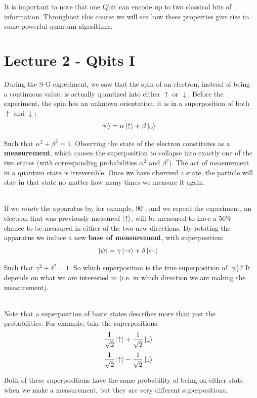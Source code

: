 \documentclass[12pt]{article}
\begin{document}
\noindent
It is important to note that one Qbit can encode up to two classical bits of information.
Throughout this course we will see how these properties give rise to some powerful quantum algorithms.

%
%
\newpage
\section*{Lecture 2 - Qbits I}
During the S-G experiment, we saw that the spin of an electron, instead of being a continuous value, is actually quantized into either $\uparrow$ or $\downarrow$.
Before the experiment, the spin has an unknown orientation: it is in a superposition of both $\uparrow$ and $\downarrow$:
\[ \ket{\psi} = \alpha \ket{\uparrow} + \beta \ket{\downarrow} \]

\noindent
Such that $\alpha^2 + \beta^2 = 1$.
Observing the state of the electron constitutes as a \textbf{measurement}, which causes the superposition to collapse into exactly one of the two states (with corresponding probabilities $\alpha^2$ and $\beta^2$).
The act of measurement in a quantum state is irreversible.
Once we have observed a state, the particle will stay in that state no matter how many times we measure it again.

\noindent
\\
If we \textit{rotate} the apparatus by, for example, $90^{\circ}$, and we repeat the experiment, an electron that was previously measured $\ket{\uparrow}$, will be measured to have a 50\% chance to be measured in either of the two new directions.
By rotating the apparatus we induce a new \textbf{base of measurement}, with superposition:
\[ \ket{\psi} = \gamma \ket{\rightarrow} + \delta \ket{\leftarrow} \]

\noindent
Such that $\gamma^2 + \delta^2 = 1$.
So which superposition is the true superposition of $\ket{\psi}$?
It depends on what we are interested in (i.e. in which direction we are making the measurement).

\noindent
\\
Note that a superposition of basic states describes more than just the probabilities.
For example, take the superpositions:
\[ \frac{1}{\sqrt{2}} \ket{\uparrow} + \frac{1}{\sqrt{2}} \ket{\downarrow} \]
\[ \frac{1}{\sqrt{2}} \ket{\uparrow} - \frac{1}{\sqrt{2}} \ket{\downarrow} \]

\noindent
Both of these superpositions have the same probability of being on either state when we make a measurement, but they are very different superpositions.
\end{document}

